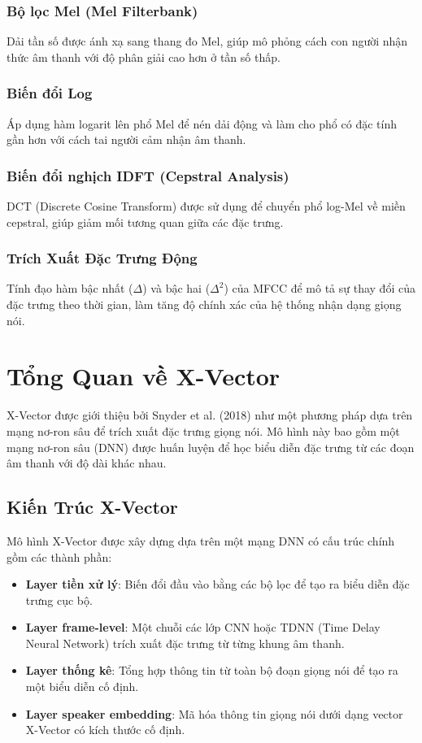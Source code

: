 \documentclass{article}
\begin{document}
\subsubsection{Bộ lọc Mel (Mel Filterbank)}
Dải tần số được ánh xạ sang thang đo Mel, giúp mô phỏng cách con người nhận thức âm thanh với độ phân giải cao hơn ở tần số thấp.

\subsubsection{Biến đổi Log}
Áp dụng hàm logarit lên phổ Mel để nén dải động và làm cho phổ có đặc tính gần hơn với cách tai người cảm nhận âm thanh.

\subsubsection{Biến đổi nghịch IDFT (Cepstral Analysis)}
DCT (Discrete Cosine Transform) được sử dụng để chuyển phổ log-Mel về miền cepstral, giúp giảm mối tương quan giữa các đặc trưng.

\subsubsection{Trích Xuất Đặc Trưng Động}
Tính đạo hàm bậc nhất ($\Delta$) và bậc hai ($\Delta^2$) của MFCC để mô tả sự thay đổi của đặc trưng theo thời gian, làm tăng độ chính xác của hệ thống nhận dạng giọng nói.

\section{Tổng Quan về X-Vector}

X-Vector được giới thiệu bởi Snyder et al. (2018) như một phương pháp dựa trên mạng nơ-ron sâu để trích xuất đặc trưng giọng nói.
Mô hình này bao gồm một mạng nơ-ron sâu (DNN) được huấn luyện để học biểu diễn đặc trưng từ các đoạn âm thanh với độ dài khác nhau.

\subsection{Kiến Trúc X-Vector}

Mô hình X-Vector được xây dựng dựa trên một mạng DNN có cấu trúc chính gồm các thành phần:

\begin{itemize}
    \item \textbf{Layer tiền xử lý}: Biến đổi đầu vào bằng các bộ lọc để tạo ra biểu diễn đặc trưng cục bộ.
    \item \textbf{Layer frame-level}: Một chuỗi các lớp CNN hoặc TDNN (Time Delay Neural Network) trích xuất đặc trưng từ từng khung âm thanh.
    \item \textbf{Layer thống kê}: Tổng hợp thông tin từ toàn bộ đoạn giọng nói để tạo ra một biểu diễn cố định.
    \item \textbf{Layer speaker embedding}: Mã hóa thông tin giọng nói dưới dạng vector X-Vector có kích thước cố định.
\end{itemize}
\end{document}
